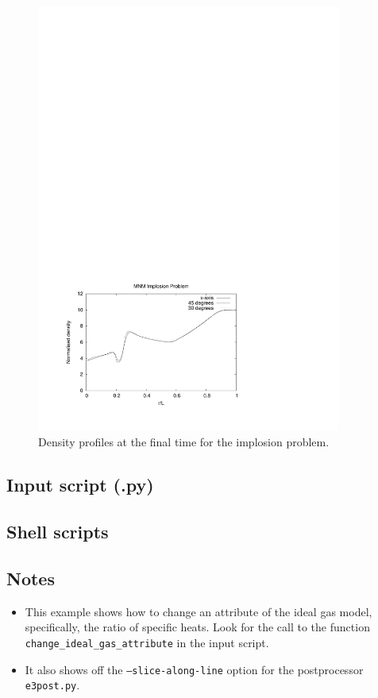 \begin{figure}[htbp]
\begin{center}
\includegraphics[width=10cm,viewport=55 49 397 293,clip=true]{../2D/implosion/density-vs-radius.pdf}
\end{center}
\caption{Density profiles at the final time for the implosion problem.}
\label{implosion-density-profiles-fig}
\end{figure}

\medskip

\newpage

\subsection{Input script (.py)}
\label{implosion-py-file}
\topbar

\bottombar


\subsection{Shell scripts}
\label{implosion-sh-files}
\topbar

\bottombar

\subsection{Notes}
\begin{itemize}
\item This example shows how to change an attribute of the ideal gas model,
  specifically, the ratio of specific heats.
  Look for the call to the function \texttt{change\_ideal\_gas\_attribute}
  in the input script. 
\item It also shows off the \texttt{--slice-along-line} option for 
  the postprocessor \texttt{e3post.py}.
\end{itemize}
